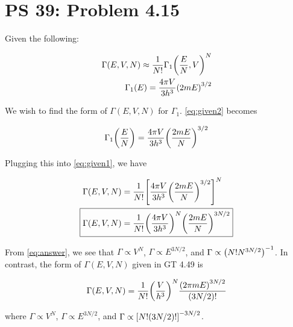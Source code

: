 \documentclass[12pt,a4paper]{article}
\begin{document}
\setcounter{page}{1}

\section*{PS 39: Problem 4.15}
\bigskip

Given the following:

\begin{eqnarray}
	\Gamma(E,V,N) \approx \frac{1}{N!}\Gamma_1\qty(\frac{E}{N}, V)^N \label{eq:given1} \\
	\Gamma_1(E) = \frac{4\pi V}{3h^3}\qty(2mE)^{3/2} \label{eq:given2}
\end{eqnarray}

We wish to find the form of $\Gamma(E,V,N)$ for $\Gamma_1$. \eqref{eq:given2} becomes

\begin{equation}
	\Gamma_1\qty(\frac{E}{N}) = \frac{4\pi V}{3h^3}\qty(\frac{2mE}{N})^{3/2}
\end{equation}

Plugging this into \eqref{eq:given1}, we have

\begin{align}
	\Gamma(E,V,N) &= \frac{1}{N!}\qty[\frac{4\pi V}{3h^3}\qty(\frac{2mE}{N})^{3/2}]^N \nonumber \\
	\Aboxed{
		\Gamma(E,V,N) &= \frac{1}{N!}\qty(\frac{4\pi V}{3h^3})^N \qty(\frac{2mE}{N})^{3N/2}
	} \label{eq:answer}
\end{align}

From \eqref{eq:answer}, we see that $\Gamma \propto V^N$, $\Gamma \propto E^{3N/2}$, and $\Gamma \propto \qty(N!N^{3N/2})^{-1}$. In contrast, the form of $\Gamma(E,V,N)$ given in GT 4.49 is

\begin{equation}
	\Gamma(E,V,N) = \frac{1}{N!}\qty(\frac{V}{h^3})^N \frac{\qty(2\pi mE)^{3N/2}}{\qty(3N/2)!} \label{eq:semiclassical}
\end{equation}

where $\Gamma \propto V^N$, $\Gamma \propto E^{3N/2}$, and $\Gamma \propto \qty[N!\qty(3N/2)!]^{-3N/2}$.
\end{document}
